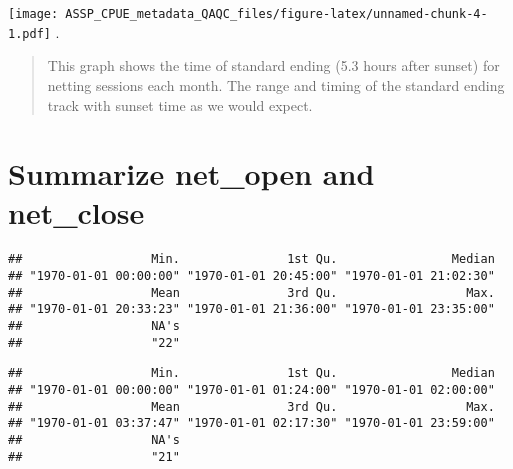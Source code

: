 \documentclass[
]{article}
\newenvironment{Shaded}{\begin{snugshade}}{\end{snugshade}}
\newcommand{\CommentTok}[1]{\textcolor[rgb]{0.56,0.35,0.01}{\textit{#1}}}
\newcommand{\DecValTok}[1]{\textcolor[rgb]{0.00,0.00,0.81}{#1}}
\newcommand{\KeywordTok}[1]{\textcolor[rgb]{0.13,0.29,0.53}{\textbf{#1}}}
\newcommand{\NormalTok}[1]{#1}
\newcommand{\OperatorTok}[1]{\textcolor[rgb]{0.81,0.36,0.00}{\textbf{#1}}}
\begin{document}
\texttt{[image: ASSP\_CPUE\_metadata\_QAQC\_files/figure-latex/unnamed-chunk-4-1.pdf]}
.

\begin{quote}
This graph shows the time of standard ending (5.3 hours after sunset)
for netting sessions each month. The range and timing of the standard
ending track with sunset time as we would expect.
\end{quote}

\hypertarget{summarize-net_open-and-net_close}{%
\section{Summarize net\_open and
net\_close}\label{summarize-net_open-and-net_close}}

\begin{Shaded}
\end{Shaded}

\begin{verbatim}
##                  Min.               1st Qu.                Median 
## "1970-01-01 00:00:00" "1970-01-01 20:45:00" "1970-01-01 21:02:30" 
##                  Mean               3rd Qu.                  Max. 
## "1970-01-01 20:33:23" "1970-01-01 21:36:00" "1970-01-01 23:35:00" 
##                  NA's 
##                  "22"
\end{verbatim}

\begin{Shaded}
\end{Shaded}

\begin{verbatim}
##                  Min.               1st Qu.                Median 
## "1970-01-01 00:00:00" "1970-01-01 01:24:00" "1970-01-01 02:00:00" 
##                  Mean               3rd Qu.                  Max. 
## "1970-01-01 03:37:47" "1970-01-01 02:17:30" "1970-01-01 23:59:00" 
##                  NA's 
##                  "21"
\end{verbatim}
\end{document}
